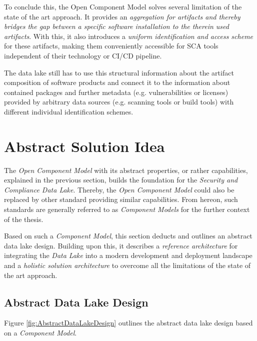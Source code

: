 To conclude this, the Open Component Model solves several limitation of the state of the art approach. It provides an \emph{aggregation for artifacts and thereby bridges the gap between a specific software installation to the therein used artifacts}. With this, it also introduces a \emph{uniform identification and access scheme} for these artifacts, making them conveniently accessible for SCA tools independent of their technology or CI/CD pipeline.\par
The data lake still has to use this structural information about the artifact composition of software products and connect it to the information about contained packages and further metadata (e.g. vulnerabilities or licenses) provided by arbitrary data sources (e.g. scanning tools or build tools) with different individual identification schemes. 

\section{Abstract Solution Idea}
The \emph{Open Component Model} with its abstract properties, or rather capabilities, explained in the previous section, builds the foundation for the \emph{Security and Compliance Data Lake}. Thereby, the \emph{Open Component Model} could also be replaced by other standard providing similar capabilities. From hereon, such standards are generally referred to as \emph{Component Models} for the further context of the thesis.\par
Based on such a \emph{Component Model}, this section deducts and outlines an abstract data lake design. Building upon this, it describes a \emph{reference architecture} for integrating the \emph{Data Lake} into a modern development and deployment landscape and a \emph{holistic solution architecture} to overcome all the limitations of the state of the art approach.

\subsection{Abstract Data Lake Design}
Figure \ref{fig:AbstractDataLakeDesign} outlines the abstract data lake design based on a \emph{Component Model}.\\


